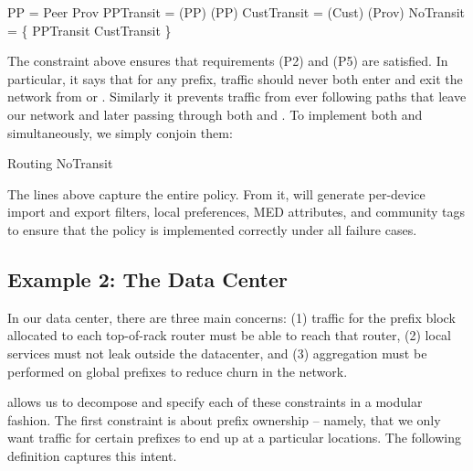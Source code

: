
\begin{code}
\Define PP = Peer \OR Prov
\Define PPTransit   = \Enter(PP) \AND \Exit(PP)
\Define CustTransit = \Later(Cust) \AND \Later(Prov)
\Define NoTransit   = \{
    \True \Path \NOT{}PPTransit \AND \NOT{}CustTransit
\}
\end{code}
\noindent
The  constraint above ensures that requirements (P2) and (P5) are satisfied. In particular, it says that for any prefix, traffic should never both enter and exit the network from  or . Similarly it prevents traffic from ever following paths that leave our network and later passing through both  and .  To implement both 
and  simultaneously, we simply conjoin them:


\begin{code}
Routing \AND{} NoTransit
\end{code}

\noindent
The lines above capture the entire policy. From it, \sysname will generate per-device import and export filters, local preferences,
MED attributes, and community tags to ensure that the policy is
implemented correctly under all failure cases.

\subsection{Example 2: The Data Center}

In our data center,
there are three main concerns:
(1) traffic for the prefix block allocated to each top-of-rack router must be able to reach that router,
(2) local services must not leak outside the datacenter, and
(3) aggregation must be performed on global prefixes to reduce churn
in the network.

\sysname allows us to decompose and specify each of these constraints in a modular fashion. The first constraint is about prefix ownership -- namely, that we only want traffic for certain prefixes to end up at a particular locations. The following definition captures this intent.

